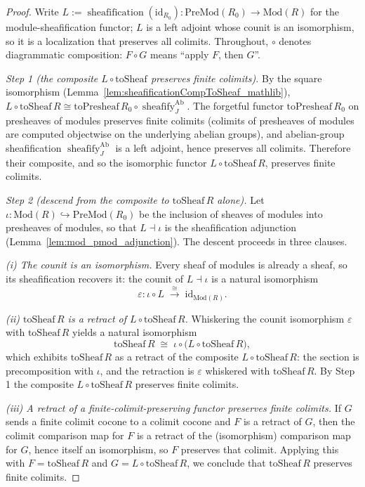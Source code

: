 \begin{proof}
  \leanok
  Write \(L := \operatorname{sheafification}(\mathrm{id}_{R_0}) : \mathrm{PreMod}(R_0) \to
  \mathrm{Mod}(R)\) for the module-sheafification functor; \(L\) is a left adjoint whose counit is an
  isomorphism, so it is a localization that preserves all colimits. Throughout, \(\circ\) denotes
  diagrammatic composition: \(F \circ G\) means ``apply \(F\), then \(G\)''.

  \emph{Step 1 (the composite \(L \circ \mathrm{toSheaf}\) preserves finite colimits).} By the
  square isomorphism (Lemma~\ref{lem:sheafificationCompToSheaf_mathlib}),
  \(L \circ \mathrm{toSheaf}\,R \cong \mathrm{toPresheaf}\,R_0 \circ
  \operatorname{sheafify}_J^{\mathrm{Ab}}\). The forgetful functor \(\mathrm{toPresheaf}\,R_0\) on
  presheaves of modules preserves finite colimits (colimits of presheaves of modules are computed
  objectwise on the underlying abelian groups), and abelian-group sheafification
  \(\operatorname{sheafify}_J^{\mathrm{Ab}}\) is a left adjoint, hence preserves all colimits.
  Therefore their composite, and so the isomorphic functor \(L \circ \mathrm{toSheaf}\,R\), preserves
  finite colimits.

  \emph{Step 2 (descend from the composite to \(\mathrm{toSheaf}\,R\) alone).} Let
  \(\iota : \mathrm{Mod}(R) \hookrightarrow \mathrm{PreMod}(R_0)\) be the inclusion of sheaves of
  modules into presheaves of modules, so that \(L \dashv \iota\) is the sheafification adjunction
  (Lemma~\ref{lem:mod_pmod_adjunction}). The descent proceeds in three clauses.

  \emph{(i) The counit is an isomorphism.} Every sheaf of modules is already a sheaf, so its
  sheafification recovers it: the counit of \(L \dashv \iota\) is a natural isomorphism
  \[
    \varepsilon : \iota \circ L \;\xrightarrow{\;\cong\;}\; \mathrm{id}_{\mathrm{Mod}(R)} .
  \]

  \emph{(ii) \(\mathrm{toSheaf}\,R\) is a retract of \(L \circ \mathrm{toSheaf}\,R\).} Whiskering the
  counit isomorphism \(\varepsilon\) with \(\mathrm{toSheaf}\,R\) yields a natural isomorphism
  \[
    \mathrm{toSheaf}\,R \;\cong\; \iota \circ \bigl(L \circ \mathrm{toSheaf}\,R\bigr),
  \]
  which exhibits \(\mathrm{toSheaf}\,R\) as a retract of the composite \(L \circ \mathrm{toSheaf}\,R\):
  the section is precomposition with \(\iota\), and the retraction is \(\varepsilon\) whiskered with
  \(\mathrm{toSheaf}\,R\). By Step 1 the composite \(L \circ \mathrm{toSheaf}\,R\) preserves finite
  colimits.

  \emph{(iii) A retract of a finite-colimit-preserving functor preserves finite colimits.} If \(G\)
  sends a finite colimit cocone to a colimit cocone and \(F\) is a retract of \(G\), then the colimit
  comparison map for \(F\) is a retract of the (isomorphism) comparison map for \(G\), hence itself an
  isomorphism, so \(F\) preserves that colimit. Applying this with \(F = \mathrm{toSheaf}\,R\) and
  \(G = L \circ \mathrm{toSheaf}\,R\), we conclude that \(\mathrm{toSheaf}\,R\) preserves finite
  colimits.
\end{proof}

